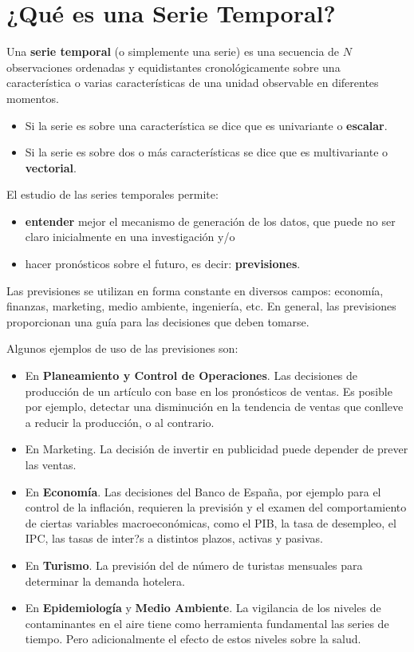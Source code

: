 \documentclass[]{book}
\providecommand{\tightlist}{%
  \setlength{\itemsep}{0pt}\setlength{\parskip}{0pt}}
\begin{document}
\hypertarget{que-es-una-serie-temporal}{%
\section{¿Qué es una Serie Temporal?}\label{que-es-una-serie-temporal}}

Una \textbf{serie temporal} (o simplemente una serie) es una secuencia de \(N\) observaciones ordenadas y equidistantes cronológicamente sobre una característica o varias características de una unidad observable en diferentes momentos.

\begin{itemize}
\tightlist
\item
  Si la serie es sobre una característica se dice que es univariante o \textbf{escalar}.
\item
  Si la serie es sobre dos o más características se dice que es multivariante o \textbf{vectorial}.
\end{itemize}

El estudio de las series temporales permite:

\begin{itemize}
\tightlist
\item
  \textbf{entender} mejor el mecanismo de generación de los datos, que puede no ser claro inicialmente en una investigación y/o
\item
  hacer pronósticos sobre el futuro, es decir: \textbf{previsiones}.
\end{itemize}

Las previsiones se utilizan en forma constante en diversos campos: economía, finanzas, marketing, medio ambiente, ingeniería, etc. En general, las previsiones proporcionan una guía para las decisiones que deben tomarse.

Algunos ejemplos de uso de las previsiones son:

\begin{itemize}
\item
  En \textbf{Planeamiento y Control de Operaciones}. Las decisiones de producción de un artículo con base en los pronósticos de ventas. Es posible por ejemplo, detectar una disminución en la tendencia de ventas que conlleve a reducir la producción, o al contrario.
\item
  En Marketing. La decisión de invertir en publicidad puede depender de prever las ventas.
\item
  En \textbf{Economía}. Las decisiones del Banco de España, por ejemplo para el control de la inflación, requieren la previsión y el examen del comportamiento de ciertas variables macroeconómicas, como el PIB, la tasa de desempleo, el IPC, las tasas de inter?s a distintos plazos, activas y pasivas.
\item
  En \textbf{Turismo}. La previsión del de número de turistas mensuales para determinar la demanda hotelera.
\item
  En \textbf{Epidemiología} y \textbf{Medio Ambiente}. La vigilancia de los niveles de contaminantes en el aire tiene como herramienta fundamental las series de tiempo. Pero adicionalmente el efecto de estos niveles sobre la salud.
\end{itemize}
\end{document}
